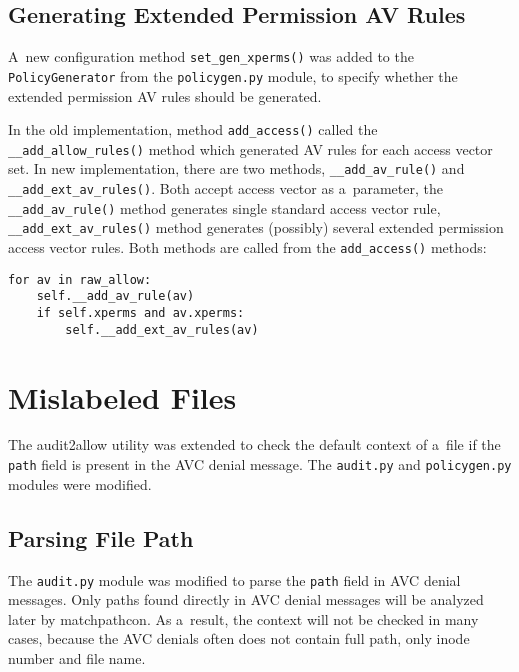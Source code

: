 \subsection{Generating Extended Permission AV Rules}
A~new configuration method \texttt{set\_gen\_xperms()} was added to the
\texttt{PolicyGenerator} from the \texttt{policygen.py} module, to specify
whether the extended permission AV rules should be generated.

In the old implementation, method \texttt{add\_access()} called the
\texttt{\_\_add\_allow\_rules()} method which generated AV rules for each
access vector set. In new implementation, there are two methods,
\texttt{\_\_add\_av\_rule()} and \texttt{\_\_add\_ext\_av\_rules()}. Both accept
access vector as a~parameter, the \texttt{\_\_add\_av\_rule()} method generates
single standard access vector rule, \texttt{\_\_add\_ext\_av\_rules()} method
generates (possibly) several extended permission access vector rules. Both
methods are called from the \texttt{add\_access()} methods:
\begin{lstlisting}
for av in raw_allow:
    self.__add_av_rule(av)
    if self.xperms and av.xperms:
        self.__add_ext_av_rules(av)
\end{lstlisting}


\section{Mislabeled Files}
The audit2allow utility was extended to check the default context of a~file if
the \texttt{path} field is present in the AVC denial message. The
\texttt{audit.py} and \texttt{policygen.py} modules were modified.

\subsection{Parsing File Path}
The \texttt{audit.py} module was modified to parse the \texttt{path} field in
AVC denial messages. Only paths found directly in AVC denial messages will be
analyzed later by matchpathcon. As a~result, the context will not be checked in
many cases, because the AVC denials often does not contain full path, only inode
number and file name.

